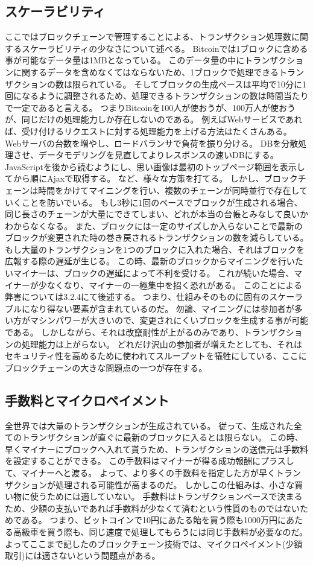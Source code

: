 \subsection{スケーラビリティ}
ここではブロックチェーンで管理することによる、トランザクション処理数に関するスケーラビリティの少なさについて述べる。
Bitcoinでは1ブロックに含める事が可能なデータ量は1MBとなっている。
このデータ量の中にトランザクションに関するデータを含めなくてはならないため、1ブロックで処理できるトランザクションの数は限られている。
そしてブロックの生成ペースは平均で10分に1回になるように調整されるため、処理できるトランザクションの数は時間当たりで一定であると言える。
つまりBitcoinを100人が使おうが、100万人が使おうが、同じだけの処理能力しか存在しないのである。
例えばWebサービスであれば、受け付けるリクエストに対する処理能力を上げる方法はたくさんある。
Webサーバの台数を増やし、ロードバランサで負荷を振り分ける。
DBを分散処理させ、データモデリングを見直してよりレスポンスの速いDBにする。
JavaScriptを後から読むようにし、思い画像は最初のトップページ範囲を表示してから順にAjaxで取得する。
など、様々な方策を打てる。
しかし、ブロックチェーンは時間をかけてマイニングを行い、複数のチェーンが同時並行で存在していくことを防いでいる。
もし3秒に1回のペースでブロックが生成される場合、同じ長さのチェーンが大量にできてしまい、どれが本当の台帳とみなして良いかわからなくなる。
また、ブロックには一定のサイズしか入らないことで最新のブロックが変更された時の巻き戻されるトランザクションの数を減らしている。
もし大量のトランザクションを1つのブロックに入れた場合、それはブロックを広報する際の遅延が生じる。
この時、最新のブロックからマイニングを行いたいマイナーは、ブロックの遅延によって不利を受ける。
これが続いた場合、マイナーが少なくなり、マイナーの一極集中を招く恐れがある。
このことによる弊害については3.2.4にて後述する。
つまり、仕組みそのものに固有のスケーラブルになり得ない要素が含まれているのだ。
勿論、マイニングには参加者が多い方がマシンパワーが大きいので、変更されにくいブロックを生成する事が可能である。
しかしながら、それは改竄耐性が上がるのみであり、トランザクションの処理能力は上がらない。
どれだけ沢山の参加者が増えたとしても、それはセキュリティ性を高めるために使われてスループットを犠牲にしている、ここにブロックチェーンの大きな問題点の一つが存在する。

\subsection{手数料とマイクロペイメント}
全世界では大量のトランザクションが生成されている。
従って、生成された全てのトランザクションが直ぐに最新のブロックに入るとは限らない。
この時、早くマイナーにブロックへ入れて貰うため、トランザクションの送信元は手数料を設定することができる。
この手数料はマイナーが得る成功報酬にプラスして、マイナーへと渡る。
よって、より多くの手数料を指定した方が早くトランザクションが処理される可能性が高まるのだ。
しかしこの仕組みは、小さな買い物に使うためには適していない。
手数料はトランザクションベースで決まるため、少額の支払いであれば手数料が少なくて済むという性質のものではないためである。
つまり、ビットコインで10円にあたる飴を買う際も1000万円にあたる高級車を買う際も、同じ速度で処理してもらうには同じ手数料が必要なのだ。
よってここまで記したのブロックチェーン技術では、マイクロペイメント(少額取引)には適さないという問題点がある。

